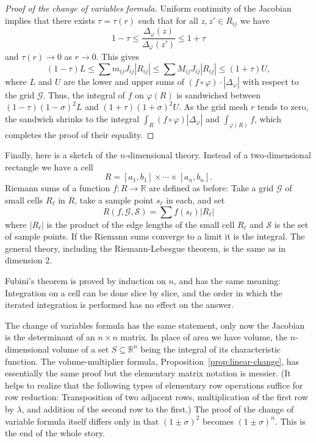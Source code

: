 \documentclass[11pt]{article}
\begin{document}
\begin{proof}[Proof of the change of variables formula]
  Uniform continuity of the Jacobian implies that there exists $\tau = \tau(r)$ such that for all $z, z' \in R_{ij}$ we have
  \[
    1 - \tau \leqslant \frac{ \Delta_\varphi(z) }{ \Delta_\varphi(z') } \leqslant 1 + \tau
  \]
  and $\tau(r) \to 0$ as $r \to 0$.  This gives
  \begin{equation}
    \label{eq:19}
    (1-\tau) L \leqslant \sum m_{ij} J_{ij} |R_{ij}| \leqslant \sum M_{ij} J_{ij} |R_{ij}| \leqslant (1 + \tau) U,
  \end{equation}
  where $L$ and $U$ are the lower and upper sums of $(f \circ \varphi) \cdot | \Delta_\varphi |$ with respect to the grid $\mathcal{G}$.  Thus, the integral of $f$ on $\varphi(R)$ is sandwiched between $(1-\tau)(1-\sigma)^2 L$ and $(1+\tau)(1+\sigma)^2 U$.  As the grid mesh $r$ tends to zero, the sandwich shrinks to the integral $\int_R (f\circ \varphi) |\Delta_\varphi|$ and $\int_{\varphi(R)} f$, which completes the proof of their equality.
\end{proof}

Finally, here is a sketch of the $n$-dimensional theory.  Instead of a two-dimensional rectangle we have a cell
\[
  R = [a_1,b_1] \times \cdots \times [a_n,b_n].
\]
Riemann sums of a function $f: R \to \mathbb{R}$ are defined as before: Take a grid $\mathcal{G}$ of small cells $R_\ell$ in $R$, take a sample point $s_\ell$ in each, and set
\[
  R(f,\mathcal{G},\mathcal{S}) = \sum f(s_\ell) |R_\ell|
\]
where $|R_\ell|$ is the product of the edge lengths of the small cell $R_\ell$ and $\mathcal{S}$ is the set of sample points.  If the Riemann sums converge to a limit it is the integral.  The general theory, including the Riemann-Lebesgue theorem, is the same as in dimension 2.

Fubini's theorem is proved by induction on $n$, and has the same meaning: Integration on a cell can be done slice by slice, and the order in which the iterated integration is performed has no effect on the answer.

The change of variables formula has the same statement, only now the Jacobian is the determinant of an $n \times n$ matrix.  In place of area we have volume, the $n$-dimensional volume of a set $S \subseteq \mathbb{R}^n$ being the integral of its characteristic function.  The volume-multiplier formula, Proposition~\ref{prop:linear-change}, has essentially the same proof but the elementary matrix notation is messier.  (It helps to realize that the following types of elementary row operations suffice for row reduction: Transposition of two adjacent rows, multiplication of the first row by $\lambda$, and addition of the second row to the first.)  The proof of the change of variable formula itself differs only in that $(1\pm\sigma)^2$ becomes $(1\pm\sigma)^n$.  This is the end of the whole story.
\end{document}
